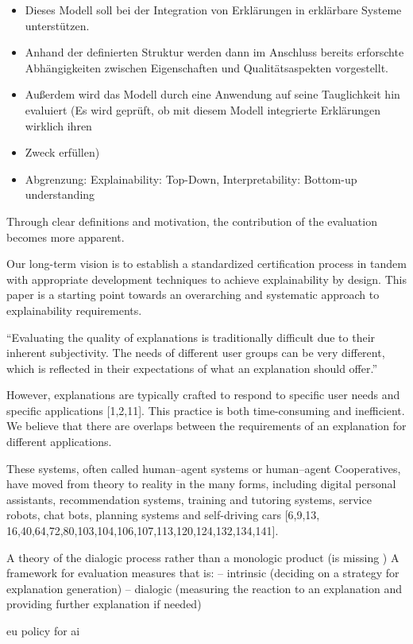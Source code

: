 \begin{itemize}
    \item Dieses Modell soll bei der Integration von Erklärungen in erklärbare Systeme unterstützen.
    \item Anhand der definierten Struktur werden dann im Anschluss bereits erforschte Abhängigkeiten zwischen Eigenschaften und Qualitätsaspekten vorgestellt.
    \item Außerdem wird das Modell durch eine Anwendung auf seine Tauglichkeit hin evaluiert (Es wird geprüft, ob mit diesem Modell integrierte Erklärungen wirklich ihren     \item Zweck erfüllen)
    \item Abgrenzung: Explainability: Top-Down, Interpretability: Bottom-up understanding \cite{thomson_knowledge--information_2020}
\end{itemize}


















\glqq Through clear definitions and motivation, the contribution of the evaluation becomes more apparent. \grqq{} \cite{waa_evaluating_2021}

Our long-term vision is to establish a standardized certification process in tandem with appropriate development techniques to achieve explainability by design. This paper is a starting point towards an overarching and systematic approach to explainability requirements.

“Evaluating the quality of explanations is traditionally difficult due to their inherent subjectivity. The needs of different user groups can be very different, which is reflected in their expectations of what an explanation should offer.” \cite{martin_developing_2019, martin_evaluating_2021}

However, explanations are typically crafted to respond to specific user needs and specific applications [1,2,11]. This practice is both time-consuming and inefficient. We believe that there are overlaps between the requirements of an explanation for different applications. \cite{martin_developing_2019}

These systems, often called human–agent systems or human–agent Cooperatives, have moved from theory to reality in the many forms, including digital personal assistants, recommendation systems, training and tutoring systems, service robots, chat bots, planning systems and self-driving cars [6,9,13, 16,40,64,72,80,103,104,106,107,113,120,124,132,134,141].

A theory of the dialogic process rather than a monologic product (is missing \cite{cassens_ambient_2019}) A framework for evaluation measures that is: – intrinsic (deciding on a strategy for explanation generation) – dialogic (measuring the reaction to an explanation and providing further explanation if needed)

\cite{hleg2019policy} eu policy for ai